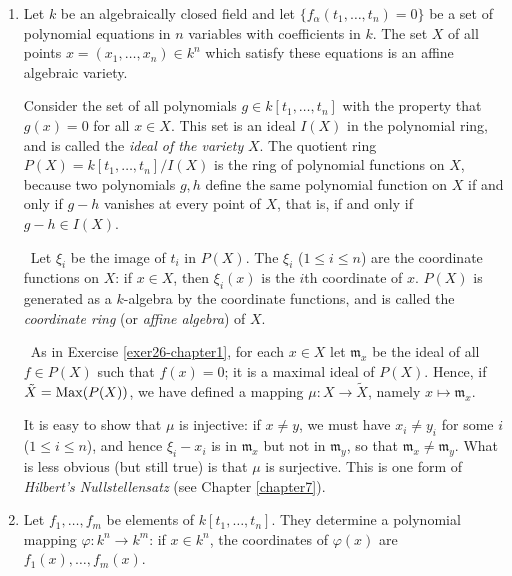 \begin{enumerate}
\begin{enumerate}[i)]
        Thus $X$ can be reconstructed from the ring of functions $C(X)$.
    \end{enumerate}
    

    \emph{Affine algebraic varieties.}
    \item \label{exer27-chapter1} Let $k$ be an algebraically closed field and let $\{f_\alpha(t_1, \ldots, t_n) = 0\}$ be a set of polynomial equations in $n$ variables with coefficients in $k$. The set $X$ of all points $x = (x_1, \ldots, x_n) \in k^n$ which satisfy these equations is an affine algebraic variety.

    Consider the set of all polynomials $g \in k[t_1, \ldots, t_n]$ with the property that $g(x) = 0$ for all $x \in X$. This set is an ideal $I(X)$ in the polynomial ring, and is called the \emph{ideal of the variety} $X$. The quotient ring $P(X) = k[t_1, \ldots, t_n]/I(X)$ is the ring of polynomial functions on $X$, because two polynomials $g, h$ define the same polynomial function on $X$ if and only if $g - h$ vanishes at every point of $X$, that is, if and only if $g - h \in I(X)$.
    
    \quad\, Let $\xi_i$ be the image of $t_i$ in $P(X)$. The $\xi_i$ ($1 \leq i \leq n$) are the coordinate functions on $X$: if $x \in X$, then $\xi_i(x)$ is the $i$th coordinate of $x$. $P(X)$ is generated as a $k$-algebra by the coordinate functions, and is called the \emph{coordinate ring} (or \emph{affine algebra}) of $X$.

    \quad\, As in Exercise \ref{exer26-chapter1}, for each $x \in X$ let $\mathfrak{m}_x$ be the ideal of all $f \in P(X)$ such that $f(x) = 0$; it is a maximal ideal of $P(X)$. Hence, if $\tilde{X} = \operatorname{Max}(P(X))$, we have defined a mapping $\mu \colon X \to \tilde{X}$, namely $x \mapsto \mathfrak{m}_x$.

    It is easy to show that $\mu$ is injective: if $x \neq y$, we must have $x_i \neq y_i$ for some $i$ ($1 \leq i \leq n$), and hence $\xi_i - x_i$ is in $\mathfrak{m}_x$ but not in $\mathfrak{m}_y$, so that $\mathfrak{m}_x \neq \mathfrak{m}_y$. What is less obvious (but still true) is that $\mu$ is surjective. This is one form of \emph{Hilbert's Nullstellensatz} (see Chapter \ref{chapter7}).

    \item \label{exer28-chapter1}Let $f_1, \ldots, f_m$ be elements of $k[t_1, \ldots, t_n]$. They determine a polynomial mapping $\varphi \colon k^n \to k^m$: if $x \in k^n$, the coordinates of $\varphi(x)$ are $f_1(x), \ldots, f_m(x)$.


\end{enumerate}
